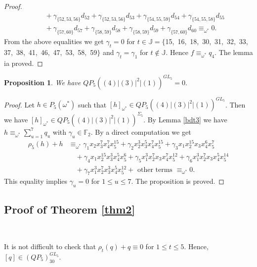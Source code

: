 \documentclass[reqno]{amsart}
\theoremstyle{plain}
\theoremstyle{definition}
\theoremstyle{plain}
\newtheorem{props}[thms]{Proposition}
\theoremstyle{definition}
\numberwithin{equation}{section}
\begin{document}
\begin{proof}
\begin{align*}
&\quad + \gamma_{\{52,53,56\}}d_{52} + \gamma_{\{52,53,56\}}d_{53} + \gamma_{\{54,55,59\}}d_{54} + \gamma_{\{54,55,58\}}d_{55}\\ 
&\quad + \gamma_{\{57,60\}}d_{57} + \gamma_{\{58,59\}}d_{58} + \gamma_{\{58,59\}}d_{59} + \gamma_{\{57,60\}}d_{60} \equiv_{\omega^*} 0.
\end{align*}
From the above equalities we get $\gamma_t = 0$ for $t\in 
\mathbb J = \{$15,\, 16,\, 18,\, 30,\, 31,\, 32,\, 33,\, 37,\, 38,\, 41,\, 46,\, 47,\, 53,\, 58,\, 59$\}$ and $\gamma_t = \gamma_1$ for $t \notin \mathbb J$. Hence $f \equiv_{\omega^*} q_4$. The lemma ia proved.
\end{proof}
\begin{props}\label{mdt33} We have $QP_5((4)|(3)|^2|(1))^{GL_5} = 0.$
\end{props}
\begin{proof} Let $h \in P_5(\omega^*)$ such that $[h]_{\omega^*} \in  QP_5((4)|(3)|^2|(1))^{GL_5}$. Then we have $[h]_{\omega^*} \in  QP_5((4)|(3)|^2|(1))^{\Sigma_5}$. By Lemma \ref{bdt3} we have
$h \equiv_{\omega^*} \sum_{u=1}^{7}q_u$ with $\gamma_u \in \mathbb F_2$. By a direct computation we get
\begin{align*}
\rho_5(h) + h &\equiv_{\omega^*} \gamma_{1}x_2x_3^{7}x_4^{7}x_5^{15} + \gamma_{2}x_2^{3}x_3^{5}x_4^{7}x_5^{15} + \gamma_{3}x_1x_2^{15}x_3x_4^{6}x_5^{7}\\  &\quad + \gamma_{4}x_1x_2^{15}x_3^{3}x_4^{5}x_5^{6} + \gamma_{5}x_1^{3}x_2^{7}x_3x_4^{7}x_5^{12} + \gamma_{6}x_1^{3}x_2^{7}x_3x_4^{5}x_5^{14}\\  &\quad + \gamma_{7}x_1^{3}x_2^{7}x_3^{3}x_4^{5}x_5^{12} + \mbox{ other terms } \equiv_{\omega^*} 0.
\end{align*}
This equality implies $\gamma_u = 0$ for $1 \leqslant u \leqslant 7$. The proposition is proved.
\end{proof}
 

\subsection{Proof of Theorem \ref{thm2}}\

\medskip
It is not difficult to check that $\rho_t(q) + q \equiv 0$ for $1 \leqslant t \leqslant 5$. Hence, $[q]\in (QP_5)_{30}^{GL_5}$.
\end{document}
